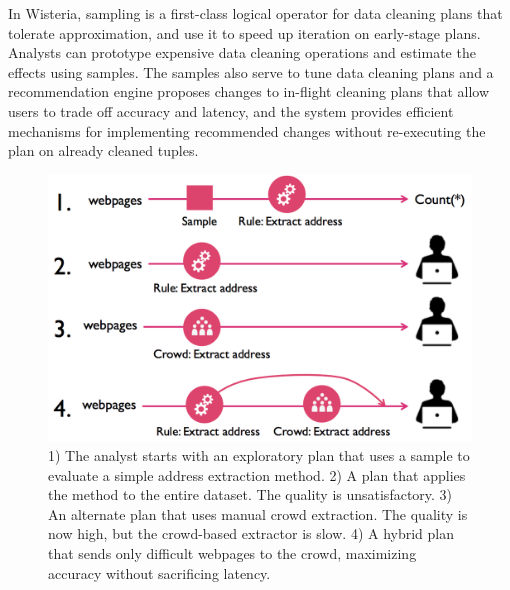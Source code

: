 In Wisteria, sampling is a first-class logical operator for data cleaning plans that tolerate approximation, and use it to speed up iteration on early-stage plans.
Analysts can prototype expensive data cleaning operations and estimate the effects using samples.
The samples also serve to tune data cleaning plans and a recommendation engine proposes changes to in-flight cleaning plans that allow users to trade off accuracy and latency, and the system provides efficient mechanisms for implementing recommended changes without re-executing the plan on already cleaned tuples.

\begin{figure}
\includegraphics[width = .4\textwidth]{figs/lifecycle.png}
\caption{
1) The analyst starts with an exploratory plan that uses a sample to evaluate a simple address extraction method.
2) A plan that applies the method to the entire dataset. The quality is unsatisfactory. 
3) An alternate plan that uses manual crowd extraction. The quality is now high, but the crowd-based extractor is slow. 
4) A hybrid plan that sends only difficult webpages to the crowd, maximizing accuracy without sacrificing latency.}
\label{fig:ex-plan}
\end{figure}



